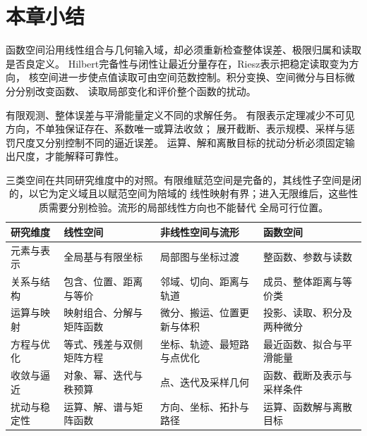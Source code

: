 \section{本章小结}
\label{sec:functional-summary}
\label{sec:functional-analysis-approximation-summary}


函数空间沿用线性组合与几何输入域，却必须重新检查整体误差、极限归属和读取是否良定义。
Hilbert完备性与闭性让最近分量存在，Riesz表示把稳定读取变为方向，
核空间进一步使点值读取可由空间范数控制。积分变换、空间微分与目标微分分别改变函数、
读取局部变化和评价整个函数的扰动。

有限观测、整体误差与平滑能量定义不同的求解任务。
有限表示定理减少不可见方向，不单独保证存在、系数唯一或算法收敛；
展开截断、表示规模、采样与惩罚尺度又分别控制不同的逼近误差。
运算、解和离散目标的扰动分析必须固定输出尺度，才能解释可靠性。

\begin{table}[htbp]
\centering
\begin{tabularx}{\linewidth}{@{}lXXX@{}}
\toprule
研究维度 & 线性空间 & 非线性空间与流形 & 函数空间\\
\midrule
元素与表示 & 全局基与有限坐标 & 局部图与坐标过渡 & 整函数、参数与读数\\
关系与结构 & 包含、位置、距离与等价 & 邻域、切向、距离与轨道 & 成员、整体距离与等价类\\
运算与映射 & 映射组合、分解与矩阵函数 & 微分、搬运、位置更新与体积 & 投影、读取、积分及两种微分\\
方程与优化 & 等式、残差与双侧矩阵方程 & 坐标、轨迹、最短路与点优化 & 最近函数、拟合与平滑能量\\
收敛与逼近 & 对象、幂、迭代与秩预算 & 点、迭代及采样几何 & 函数、截断及表示与采样条件\\
扰动与稳定性 & 运算、解、谱与矩阵函数 & 方向、坐标、拓扑与路径 & 运算、函数解与离散目标\\
\bottomrule
\end{tabularx}
\caption{三类空间在共同研究维度中的对照。有限维赋范空间是完备的，其线性子空间是闭的，以它为定义域且以赋范空间为陪域的
线性映射有界；进入无限维后，这些性质需要分别检验。流形的局部线性方向也不能替代
全局可行位置。}
\label{tab:spaces-six-dimension-comparison}
\end{table}
